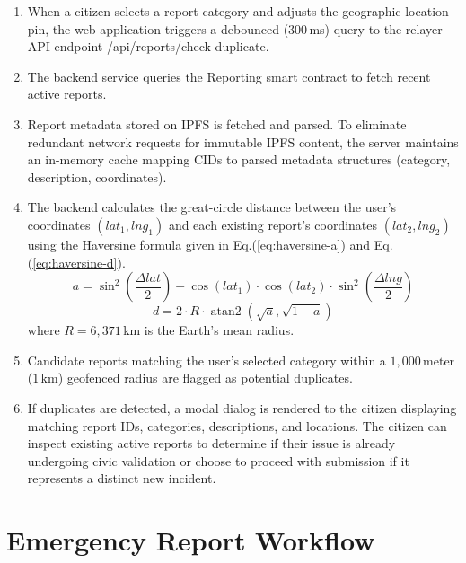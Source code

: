 \begin{enumerate}
    \item When a citizen selects a report category and adjusts the geographic location pin, the web application triggers a debounced (300\,ms) query to the relayer API endpoint   {/api/reports/check-duplicate}.
    \item The backend service queries the   {Reporting} smart contract to fetch recent active reports.
    \item Report metadata stored on \ac{IPFS} is fetched and parsed. To eliminate redundant network requests for immutable IPFS content, the server maintains an in-memory cache mapping CIDs to parsed metadata structures (category, description, coordinates).
    \item The backend calculates the great-circle distance between the user's coordinates $(lat_1, lng_1)$ and each existing report's coordinates $(lat_2, lng_2)$ using the Haversine formula given in Eq.(\ref{eq:haversine-a}) and Eq.(\ref{eq:haversine-d}). 
    \begin{equation}
        a = \sin^2\left(\frac{\Delta lat}{2}\right) + \cos(lat_1) \cdot \cos(lat_2) \cdot \sin^2\left(\frac{\Delta lng}{2}\right)
        \label{eq:haversine-a}
    \end{equation}
    \begin{equation}
        d = 2 \cdot R \cdot \operatorname{atan2}\left(\sqrt{a}, \sqrt{1-a}\right)
        \label{eq:haversine-d}
    \end{equation}
    where $R = 6{,}371\,\text{km}$ is the Earth's mean radius.
    \item  Candidate reports matching the user's selected category within a $1{,}000\,\text{meter}$ ($1\,\text{km}$) geofenced radius are flagged as potential duplicates.
    \item  If duplicates are detected, a modal dialog is rendered to the citizen displaying matching report IDs, categories, descriptions, and locations. The citizen can inspect existing active reports to determine if their issue is already undergoing civic validation or choose to proceed with submission if it represents a distinct new incident.
\end{enumerate}

\section{Emergency Report Workflow}
\label{sec:emergency-workflow}


